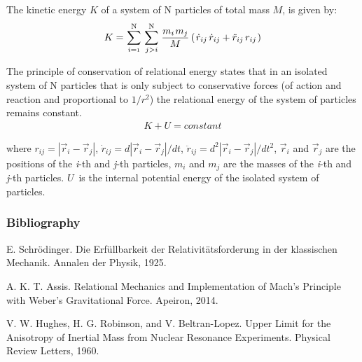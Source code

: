 \documentclass[10pt]{article}
\begin{document}
\par The kinetic energy $K$ of a system of {\small N} particles of total mass $M$, is given by:
\vspace{+0.60em}
\begin{eqnarray*}
K = \hspace{+0.06em} \sum_{i={\scriptscriptstyle 1}}^{\mathrm N} \hspace{+0.18em} \sum_{j>i}^{\mathrm N} \hspace{+0.12em} \frac{m_i \hspace{+0.09em} m_j}{M} \hspace{+0.18em} ( \hspace{+0.12em} \dot{r}_{ij} \, \dot{r}_{ij} + \ddot{r}_{ij} \, r_{ij} \hspace{+0.09em} )
\end{eqnarray*}
\vspace{+0.15em}
\par The principle of conservation of relational energy states that in an isolated system of {\small N} particles that is only subject to conservative forces (of action and reaction and proportional to $1/r^2$) the relational energy of the system of particles remains constant.
\vspace{-0.60em}
\begin{eqnarray*}
K + U = constant
\end{eqnarray*}
\vspace{-0.45em}
\par \noindent where $r_{ij}=|\vec{r}_i - \vec{r}_j|$, $\dot{r}_{ij}=d|\vec{r}_i - \vec{r}_j|/dt$, $\ddot{r}_{ij}=d^2|\vec{r}_i - \vec{r}_j|/dt^2$, $\vec{r}_i$ and $\vec{r}_j$ are the positions of the \textit{i}-th and \textit{j}-th particles, $m_i$ and $m_j$ are the masses of the \textit{i}-th and \textit{j}-th particles. \hbox {$U$ is} the internal potential energy of the isolated system of particles.

\vspace{+1.50em}

{\centering\subsubsection*{Bibliography}}

\vspace{+1.20em}

{\small

\par \hspace{-0.36em} E. Schr\"{o}dinger. Die Erf\"{u}llbarkeit der Relativit\"{a}tsforderung in der klassischen Mechanik. Annalen der Physik, 1925.
\medskip
\par \hspace{-0.36em} A. K. T. Assis. Relational Mechanics and Implementation of Mach's Principle with Weber's Gravitational Force. Apeiron, 2014.
\medskip
\par \hspace{-0.36em} V. W. Hughes, H. G. Robinson, and V. Beltran-Lopez. Upper Limit for the Anisotropy of Inertial Mass from Nuclear Resonance Experiments. Physical Review Letters, 1960.

}
\end{document}

